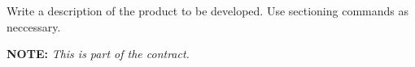 

Write a description of the product to be developed.
Use sectioning commands as neccessary.
\vspace{2\baselineskip}

\centerline{\Large {\bf NOTE:} {\em This is part of the contract.}}

